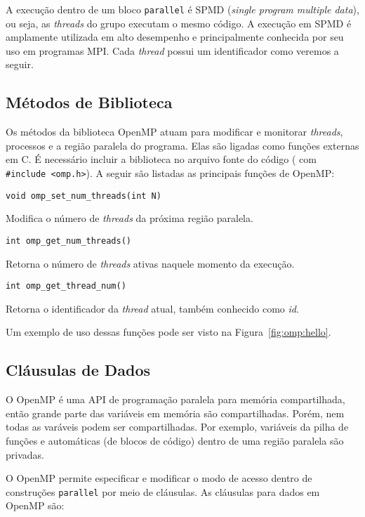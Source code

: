 A execução dentro de um bloco \texttt{parallel} é SPMD (\textit{single program multiple data}), ou seja, as \textit{threads} do grupo executam o mesmo código. A execução em SPMD é amplamente utilizada em alto desempenho e principalmente conhecida por seu uso em programas MPI. Cada \textit{thread} possui um identificador como veremos a seguir.

\subsection{Métodos de Biblioteca}
\label{sec:omp:biblio}

Os métodos da biblioteca OpenMP atuam para modificar e monitorar \textit{threads}, processos e a região paralela do programa. Elas são ligadas como funções externas em C. É necessário incluir a biblioteca no arquivo fonte do código ( com \texttt{\#include <omp.h>}). A seguir são listadas as principais funções de OpenMP:

\begin{description}
\item \verb+void omp_set_num_threads(int N)+

Modifica o número de \textit{threads} da próxima região paralela.
\item \verb+int omp_get_num_threads()+

Retorna o número de \emph{threads} ativas naquele momento da execução.
\item \verb+int omp_get_thread_num()+

Retorna o identificador da \emph{thread} atual, também conhecido como \emph{id}.
\end{description}

Um exemplo de uso dessas funções pode ser visto na Figura~\ref{fig:omp:hello}.

\subsection{Cláusulas de Dados}
\label{sec:omp:dados}

O OpenMP é uma API de programação paralela para memória compartilhada, então grande parte das variáveis em memória são compartilhadas. Porém, nem todas as varáveis podem ser compartilhadas. Por exemplo, variáveis da pilha de funções e automáticas (de blocos de código) dentro de uma região paralela são privadas.

O OpenMP permite especificar e modificar o modo de acesso dentro de construções \texttt{parallel} por meio de cláusulas. As cláusulas para dados em OpenMP são:

